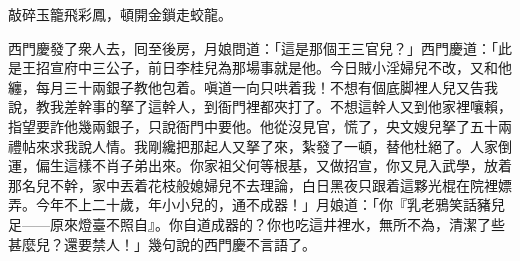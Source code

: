 \begin{myquote} 
敲碎玉籠飛彩鳳，頓開金鎖走蛟龍。
\end{myquote} 

西門慶發了衆人去，囘至後房，月娘問道：「這是那個王三官兒？」西門慶道：「此是王招宣府中三公子，前日李桂兒為那場事就是他。{}今日賊小淫婦兒不改，又和他纏，每月三十兩銀子教他包着。嗔道一向只哄着我！不想有個底脚裡人兒又告我說，教我差幹事的拏了這幹人，到衙門裡都夾打了。不想這幹人又到他家裡嚷賴，指望要詐他幾兩銀子，只說衙門中要他。他從沒見官，慌了，央文嫂兒拏了五十兩禮帖來求我說人情。我剛纔把那起人又拏了來，紮發了一頓，替他杜絕了。人家倒運，偏生這樣不肖子弟出來。你家祖父何等根基，又做招宣，你又見入武學，放着那名兒不幹，家中丟着花枝般媳婦兒不去理論，白日黑夜只跟着這夥光棍在院裡嫖弄。今年不上二十歲，年小小兒的，通不成器！」{}月娘道：「你『乳老鴉笑話豬兒足——原來燈臺不照自』。你自道成器的？你也吃這井裡水，無所不為，清潔了些甚麼兒？還要禁人！」幾句說的西門慶不言語了。

